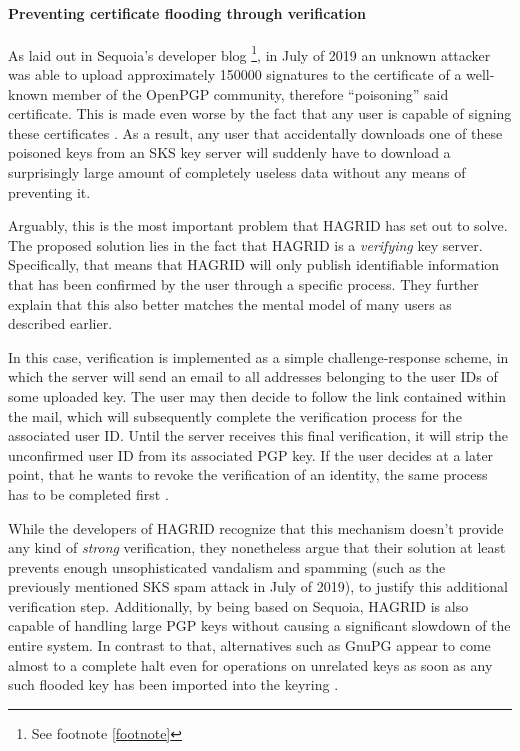 \paragraph{Preventing certificate flooding through verification}
As laid out in Sequoia's developer blog \footnote{See footnote \ref{footnote}}, in July of 2019 an unknown attacker was able to upload approximately 150000 signatures to the certificate of a well-known member of the OpenPGP community, therefore ``poisoning'' said certificate. This is made even worse by the fact that any user is capable of signing these certificates \cite{CVE_2019}. As a result, any user that accidentally downloads one of these poisoned keys from an SKS key server will suddenly have to download a surprisingly large amount of completely useless data without any means of preventing it.

Arguably, this is the most important problem that HAGRID has set out to solve. The proposed solution lies in the fact that HAGRID is a \emph{verifying} key server. Specifically, that means that HAGRID will only publish identifiable information that has been confirmed by the user through a specific process. They further explain that this also better matches the mental model of many users as described earlier.

In this case, verification is implemented as a simple challenge-response scheme, in which the server will send an email to all addresses belonging to the user IDs of some uploaded key. The user may then decide to follow the link contained within the mail, which will subsequently complete the verification process for the associated user ID.
Until the server receives this final verification, it will strip the unconfirmed user ID from its associated PGP key. If the user decides at a later point, that he wants to revoke the verification of an identity, the same process has to be completed first \cite{sequoia_blog}.

While the developers of HAGRID recognize that this mechanism doesn't provide any kind of \emph{strong} verification, they nonetheless argue that their solution at least prevents enough unsophisticated vandalism and spamming (such as the previously mentioned SKS spam attack in July of 2019), to justify this additional verification step. Additionally, by being based on Sequoia, HAGRID is also capable of handling large PGP keys without causing a significant slowdown of the entire system. In contrast to that, alternatives such as GnuPG appear to come almost to a complete halt even for operations on unrelated keys as soon as any such flooded key has been imported into the keyring \cite{flooding_blog}. 
